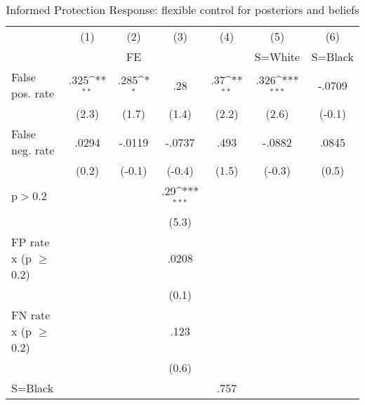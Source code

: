 \begin{table}[htbp]\centering
\def\sym#1{\ifmmode^{#1}\else\(^{#1}\)\fi}
\caption{Informed Protection Response: flexible control for posteriors and beliefs}
\begin{tabular}{l*{6}{c}}
\hline\hline
                &\multicolumn{1}{c}{(1)}&\multicolumn{1}{c}{(2)}&\multicolumn{1}{c}{(3)}&\multicolumn{1}{c}{(4)}&\multicolumn{1}{c}{(5)}&\multicolumn{1}{c}{(6)}\\
                &\multicolumn{1}{c}{}&\multicolumn{1}{c}{FE}&\multicolumn{1}{c}{}&\multicolumn{1}{c}{}&\multicolumn{1}{c}{S=White}&\multicolumn{1}{c}{S=Black}\\
\hline
False pos. rate &     .325\sym{**} &     .285\sym{*}  &      .28         &      .37\sym{**} &     .326\sym{***}&   -.0709         \\
                &    (2.3)         &    (1.7)         &    (1.4)         &    (2.2)         &    (2.6)         &   (-0.1)         \\
False neg. rate &    .0294         &   -.0119         &   -.0737         &     .493         &   -.0882         &    .0845         \\
                &    (0.2)         &   (-0.1)         &   (-0.4)         &    (1.5)         &   (-0.3)         &    (0.5)         \\
p$>$0.2         &                  &                  &      .29\sym{***}&                  &                  &                  \\
                &                  &                  &    (5.3)         &                  &                  &                  \\
FP rate x (p $\geq$ 0.2)&                  &                  &    .0208         &                  &                  &                  \\
                &                  &                  &    (0.1)         &                  &                  &                  \\
FN rate x (p $\geq$ 0.2)&                  &                  &     .123         &                  &                  &                  \\
                &                  &                  &    (0.6)         &                  &                  &                  \\
S=Black         &                  &                  &                  &     .757         &                  &                  \\

\end{tabular}
\end{table}
